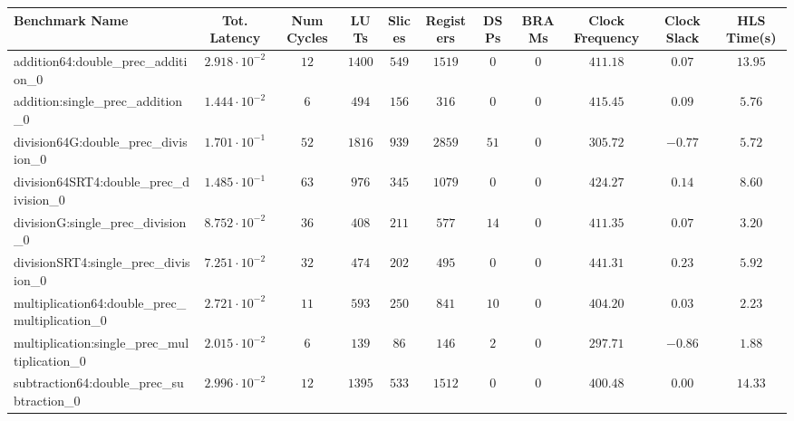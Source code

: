 \begin{tabular}{|l|c|c|c|c|c|c|c|c|c|c|}
\hline
Benchmark Name                                   & Tot. Latency            & Num Cycles & LUTs     & Slices   & Registers & DSPs   & BRAMs & Clock Frequency & Clock Slack & HLS Time(s) \\
\hline
addition64:double\_prec\_addition\_0             & $ 2.918 \cdot 10^{-2} $ & $ 12     $ & $ 1400 $ & $ 549  $ & $ 1519  $ & $ 0  $ & $ 0 $ & $ 411.18      $ & $ 0.07    $ & $ 13.95   $ \\
addition:single\_prec\_addition\_0               & $ 1.444 \cdot 10^{-2} $ & $ 6      $ & $ 494  $ & $ 156  $ & $ 316   $ & $ 0  $ & $ 0 $ & $ 415.45      $ & $ 0.09    $ & $ 5.76    $ \\
division64G:double\_prec\_division\_0            & $ 1.701 \cdot 10^{-1} $ & $ 52     $ & $ 1816 $ & $ 939  $ & $ 2859  $ & $ 51 $ & $ 0 $ & $ 305.72      $ & $ -0.77   $ & $ 5.72    $ \\
division64SRT4:double\_prec\_division\_0         & $ 1.485 \cdot 10^{-1} $ & $ 63     $ & $ 976  $ & $ 345  $ & $ 1079  $ & $ 0  $ & $ 0 $ & $ 424.27      $ & $ 0.14    $ & $ 8.60    $ \\
divisionG:single\_prec\_division\_0              & $ 8.752 \cdot 10^{-2} $ & $ 36     $ & $ 408  $ & $ 211  $ & $ 577   $ & $ 14 $ & $ 0 $ & $ 411.35      $ & $ 0.07    $ & $ 3.20    $ \\
divisionSRT4:single\_prec\_division\_0           & $ 7.251 \cdot 10^{-2} $ & $ 32     $ & $ 474  $ & $ 202  $ & $ 495   $ & $ 0  $ & $ 0 $ & $ 441.31      $ & $ 0.23    $ & $ 5.92    $ \\
multiplication64:double\_prec\_multiplication\_0 & $ 2.721 \cdot 10^{-2} $ & $ 11     $ & $ 593  $ & $ 250  $ & $ 841   $ & $ 10 $ & $ 0 $ & $ 404.20      $ & $ 0.03    $ & $ 2.23    $ \\
multiplication:single\_prec\_multiplication\_0   & $ 2.015 \cdot 10^{-2} $ & $ 6      $ & $ 139  $ & $ 86   $ & $ 146   $ & $ 2  $ & $ 0 $ & $ 297.71      $ & $ -0.86   $ & $ 1.88    $ \\
subtraction64:double\_prec\_subtraction\_0       & $ 2.996 \cdot 10^{-2} $ & $ 12     $ & $ 1395 $ & $ 533  $ & $ 1512  $ & $ 0  $ & $ 0 $ & $ 400.48      $ & $ 0.00    $ & $ 14.33   $ \\

\end{tabular}
